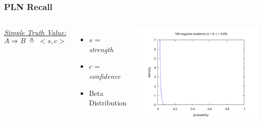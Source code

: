 \documentclass[aspectratio=169]{beamer}
\newcommand{\limp}{\Rightarrow}
\newcommand{\STV}[2]{<\!#1, #2\!>}
\begin{document}
\begin{frame}
  \frametitle{PLN Recall}
  \begin{columns}
    \column{5cm}
    \underline{\emph{Simple Truth Value:}}
    $$A \limp B\ \measeq\ \STV{s}{c}$$
    \begin{itemize}
    \item $s$ = \emph{strength}
    \item $c$ = \emph{confidence}
    \item Beta Distribution
    \end{itemize}
    \column{10cm}
    \includegraphics[scale=0.4]{figs/observations_100_0.png}
  \end{columns}
\end{frame}
\end{document}
